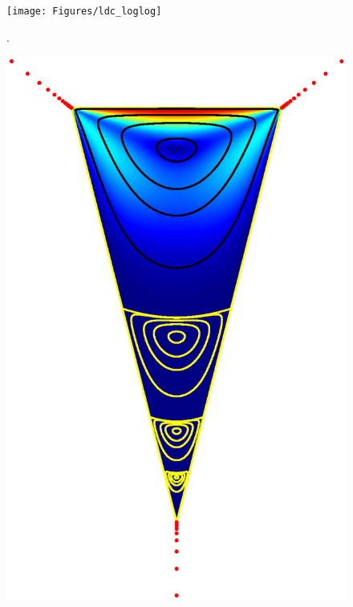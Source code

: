 \begin{figure}[H]
	\centering
	\texttt{[image: Figures/ldc\_loglog]}
	\caption{.}
	\label{fig:ldc_loglog}
\end{figure}

\begin{figure}[H]
	
	\centering
	\begin{minipage}{0.45\linewidth}
		\centering
		\includegraphics[width=\linewidth]{Figures/wedge}
	\end{minipage}
	\hfill

\end{figure}
